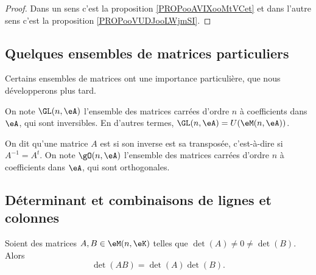 \begin{proof}
    Dans un sens c'est la proposition \ref{PROPooAVIXooMtVCet} et dans l'autre sens c'est la proposition \ref{PROPooVUDJooLWjmSI}.
\end{proof}

\subsection{Quelques ensembles de matrices particuliers}
Certains ensembles de matrices ont une importance particulière, que nous développerons plus tard.

\begin{definition}
On note \( \GL(n,\eA) \) l'ensemble des matrices carrées d'ordre \( n \) à coefficients dans \( \eA \), qui sont inversibles. En d'autres termes, \( \GL(n,\eA) = U (\eM (n,\eA) ) \).
\end{definition}

\begin{definition}\label{DefMatriceOrthogonale}
    On dit qu'une matrice \( A \) est  si son inverse est sa transposée, c'est-à-dire si \( A^{-1} = A^t \). On note \( \gO(n,\eA) \) l'ensemble des matrices carrées d'ordre \( n \) à coefficients dans \( \eA \), qui sont orthogonales.
\end{definition}

\subsection{Déterminant et combinaisons de lignes et colonnes}
\label{SUBSECooKMSVooBBHwkH}

\begin{proposition}     \label{PROPooUCZVooPkloQp}
    Soient des matrices \( A,B\in \eM(n,\eK)\) telles que \( \det(A)\neq 0\neq \det(B)\). Alors
    \begin{equation}
        \det(AB)=\det(A)\det(B).
    \end{equation}
\end{proposition}

